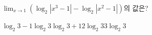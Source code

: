 $\displaystyle\lim_{x\to 1}(\log_2|x^3-1|-\log_2|x^2-1|)$의 값은?
\begin{choices32}{$\log_2 3-1$}{$\log_2 3$}{$\log_2 3+1$}{$2\log_2 3$}{$3\log_2 3$}\end{choices32}
